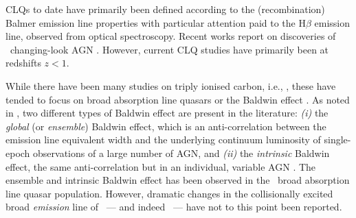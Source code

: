 \documentclass[fleqn,usenatbib]{mnras}
\begin{document}
CLQs to date have primarily been defined according to the
(recombination) Balmer emission line properties with particular
attention paid to the H$\beta$ emission line, observed from optical
spectroscopy. Recent works report on discoveries of \mgii\ changing-look
AGN \citep{Guo2019, Homan2020}. However, current CLQ studies have
primarily been at redshifts $z<1$.

While there have been many studies on triply ionised carbon, i.e.,
\civ, these have tended to focus on broad absorption line quasars
\citep[e.g., Table 1 of][]{Hemler2019} or the Baldwin effect
\citep{Baldwin1977, Bian2012, Jensen2016,
Hamann2017}. As noted in \citet{Rakic2017}, two different
types of Baldwin effect are present in the literature: {\it (i)} the {\it
global} (or {\it ensemble}) Baldwin effect, which is an
anti-correlation between the emission line equivalent width and the
underlying continuum luminosity of single-epoch observations of
a large number of AGN, and {\it (ii)} the {\it intrinsic} Baldwin
effect, the same anti-correlation but in an individual, variable 
AGN \citep{PoggePeterson1992}. The ensemble and intrinsic Baldwin effect 
has been observed in the \civ\ broad absorption line quasar population. 
However, dramatic changes in the 
collisionally excited broad {\it emission} line of \civ\ --- and
indeed \ciii\ --- have not to this point been reported.
\end{document}
